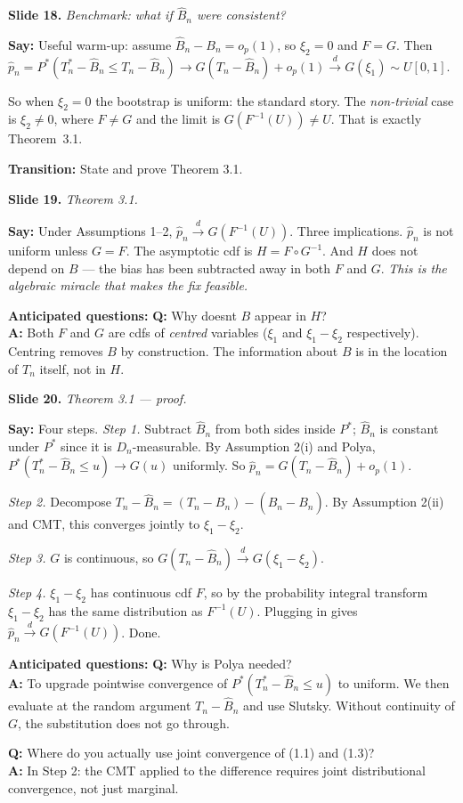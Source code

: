 \documentclass[11pt]{article}
\theoremstyle{definition}
\newcommand{\Pstar}{P^{*}}
\newcommand{\dto}{\xrightarrow{d}}
\newcommand{\Tn}{T_{n}}
\newcommand{\Tns}{T_{n}^{*}}
\newcommand{\Bn}{B_{n}}
\newcommand{\Bnh}{\hat{B}_{n}}
\newcommand{\pnh}{\hat{p}_{n}}
\newcommand{\Dn}{D_{n}}
\newcommand{\slide}[2]{%
  \medskip
  \noindent\colorbox{soft}{\parbox{\linewidth}{\textbf{Slide #1.} \textit{#2}}}
  \medskip
}
\newcommand{\say}[1]{\textbf{Say:} #1}
\newcommand{\trans}[1]{\textbf{Transition:} #1}
\newcommand{\Q}[2]{\noindent\textcolor{warn}{\textbf{Q:}} #1\\ \textcolor{accent}{\textbf{A:}} #2\par\smallskip}
\begin{document}
\slide{18}{Benchmark: what if $\Bnh$ \emph{were} consistent?}
\say{Useful warm-up: assume $\Bnh-\Bn=o_p(1)$, so $\xi_2=0$ and $F=G$. Then
$\pnh=\Pstar(\Tns-\Bnh\le\Tn-\Bnh)\to G(\Tn-\Bnh)+o_p(1)\dto G(\xi_1)\sim U[0,1]$.

So when $\xi_2=0$ the bootstrap is uniform: the standard story. The
\emph{non-trivial} case is $\xi_2\neq 0$, where $F\neq G$ and the limit is
$G(F^{-1}(U))\neq U$. That is exactly Theorem~3.1.}

\trans{State and prove Theorem 3.1.}

\slide{19}{Theorem 3.1.}
\say{Under Assumptions 1--2, $\pnh\dto G(F^{-1}(U))$. Three implications.
$\pnh$ is not uniform unless $G=F$. The asymptotic cdf is $H=F\circ G^{-1}$.
And $H$ does not depend on $B$ --- the bias has been subtracted away in both
$F$ and $G$. \emph{This is the algebraic miracle that makes the fix feasible.}}

\textbf{Anticipated questions:}
\Q{Why doesnt $B$ appear in $H$?}
{Both $F$ and $G$ are cdfs of \emph{centred} variables ($\xi_1$ and
$\xi_1-\xi_2$ respectively). Centring removes $B$ by construction. The
information about $B$ is in the location of $\Tn$ itself, not in $H$.}

\slide{20}{Theorem 3.1 --- proof.}
\say{Four steps. \emph{Step 1.} Subtract $\Bnh$ from both sides inside $\Pstar$;
$\Bnh$ is constant under $\Pstar$ since it is $\Dn$-measurable. By Assumption
2(i) and Polya, $\Pstar(\Tns-\Bnh\le u)\to G(u)$ uniformly. So
$\pnh=G(\Tn-\Bnh)+o_p(1)$.

\emph{Step 2.} Decompose $\Tn-\Bnh=(\Tn-\Bn)-(\Bnh-\Bn)$. By Assumption 2(ii)
and CMT, this converges jointly to $\xi_1-\xi_2$.

\emph{Step 3.} $G$ is continuous, so $G(\Tn-\Bnh)\dto G(\xi_1-\xi_2)$.

\emph{Step 4.} $\xi_1-\xi_2$ has continuous cdf $F$, so by the probability
integral transform $\xi_1-\xi_2$ has the same distribution as $F^{-1}(U)$.
Plugging in gives $\pnh\dto G(F^{-1}(U))$. Done.}

\textbf{Anticipated questions:}
\Q{Why is Polya needed?}
{To upgrade pointwise convergence of $\Pstar(\Tns-\Bnh\le u)$ to uniform.
We then evaluate at the random argument $\Tn-\Bnh$ and use Slutsky.
Without continuity of $G$, the substitution does not go through.}
\Q{Where do you actually use joint convergence of (1.1) and (1.3)?}
{In Step 2: the CMT applied to the difference requires joint distributional
convergence, not just marginal.}
\end{document}
